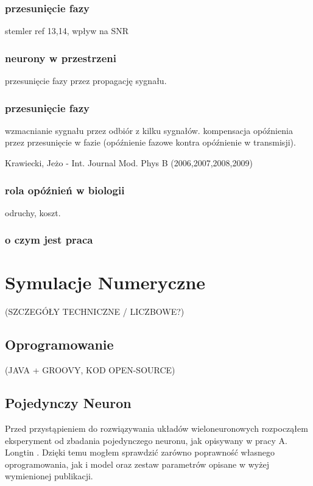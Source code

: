 \documentclass[12pt]{article}
\begin{document}
  \subsubsection{przesunięcie fazy}
  stemler ref 13,14, wpływ na SNR

  \subsubsection{neurony w przestrzeni}
  przesunięcie fazy przez propagację sygnału.
  
  \subsubsection{przesunięcie fazy}
  wzmacnianie sygnału przez odbiór z kilku sygnałów. kompensacja opóźnienia przez przesunięcie w fazie (opóźnienie fazowe kontra opóźnienie w transmisji).

  Krawiecki, Jeżo - Int. Journal Mod. Phys B (2006,2007,2008,2009)

  \subsubsection{rola opóźnień w biologii}
  odruchy, koszt.
  
  \subsubsection{o czym jest praca}

    
  \section{Symulacje Numeryczne}
  
  (SZCZEGÓŁY TECHNICZNE / LICZBOWE?)
  
  
  \subsection{Oprogramowanie}
  
  (JAVA + GROOVY, KOD OPEN-SOURCE)
  
  \subsection{Pojedynczy Neuron}
  
  Przed przystąpieniem do rozwiązywania układów wieloneuronowych rozpocząłem eksperyment od zbadania pojedynczego neuronu, jak opisywany w pracy A. Longtin \cite{longtin}. Dzięki temu mogłem sprawdzić zarówno poprawność własnego oprogramowania, jak i model oraz zestaw parametrów opisane w wyżej wymienionej publikacji.
  
\end{document}
